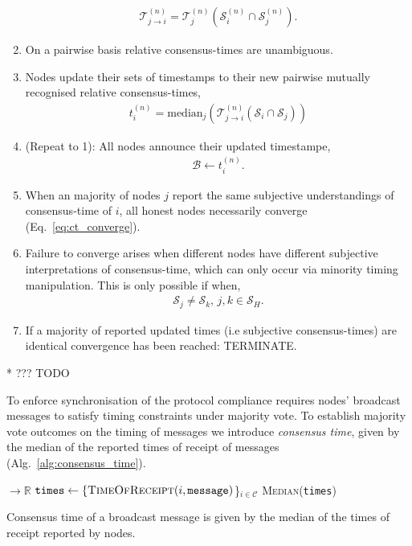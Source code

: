 \begin{enumerate}
		\begin{align}
			\mathcal{T}_{j\to i}^{(n)} = \mathcal{T}_j^{(n)}(\mathcal{S}_i^{(n)} \cap \mathcal{S}_j^{(n)}).
		\end{align}
	\item On a pairwise basis relative consensus-times are unambiguous.
	\item Nodes update their sets of timestamps to their new pairwise mutually recognised relative consensus-times,
		\begin{align}
			t_i^{(n)} = \mathrm{median}_j(\mathcal{T}_{j\to i}^{(n)}(\mathcal{S}_i \cap \mathcal{S}_j))
		\end{align}
	\item (Repeat to 1): All nodes announce their updated timestampe,
		\begin{align}
			\mathcal{B} \gets t_i^{(n)}.
		\end{align}
	\item When an majority of nodes $j$ report the same subjective understandings of consensus-time of $i$, all honest nodes necessarily converge (Eq.~\eqref{eq:ct_converge}).
	\item Failure to converge arises when different nodes have different subjective interpretations of consensus-time, which can only occur via minority timing manipulation. This is only possible if when,
		\begin{align}
			\mathcal{S}_j\neq \mathcal{S}_k, \, j,k\in \mathcal{S}_H.
		\end{align}
	\item If a majority of reported updated times (i.e subjective consensus-times) are identical convergence has been reached: TERMINATE.
\end{enumerate}

* ??? TODO

To enforce synchronisation of the protocol compliance requires nodes' broadcast messages to satisfy timing constraints under majority vote. To establish majority vote outcomes on the timing of messages we introduce \emph{consensus time}, given by the median of the reported times of receipt of messages (Alg.~\ref{alg:consensus_time}).

\begin{algorithm}[H]
	\begin{algorithmic}
		 $\to \mathbb{R}$
		\State $\texttt{times} \gets \{\textsc{TimeOfReceipt}(i,\texttt{message})$\}$_{i\in\mathcal{C}}$
		\State \Return \textsc{Median}(\texttt{times})
		\EndFunction
	\end{algorithmic}
	\caption{Consensus time of a broadcast message is given by the median of the times of receipt reported by nodes.} \label{alg:consensus_time}
\end{algorithm}

